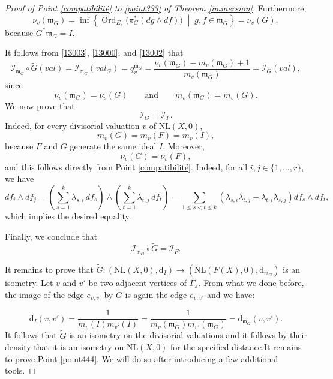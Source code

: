 \documentclass[reqno,dvipsnames,12pt]{amsart}
\begin{document}
\begin{proof}[Proof of Point \ref{compatibilité} to \ref{point333} of Theorem \ref{immersion}]
Furthermore,
\begin{equation}\label{13002}
\nu_v(\mathfrak m_G)
=
\inf \left\{
\operatorname{Ord}_{E_v}\bigl(\pi_G^*(dg\wedge df)\bigr)
\;\middle|\;
g,f\in \mathfrak m_G
\right\}
=
\nu_v(G),
\end{equation}
because \(G^*\mathfrak m_G=I\).

It follows from \eqref{13003}, \eqref{13000}, and \eqref{13002} that
\[
\mathcal{I}_{\mathfrak m_G}\circ \widetilde{G}(val)
=
\mathcal{I}_{\mathfrak m_G}(val_G)
=
q_v^{\mathfrak m_G}
=
\frac{\nu_v(\mathfrak m_G)-m_v(\mathfrak m_G)+1}{m_v(\mathfrak m_G)}
=
\mathcal{I}_{G}(val),
\]
since
\[
\nu_v(\mathfrak m_G)=\nu_v(G)
\qquad\text{and}\qquad
m_v(\mathfrak m_G)=m_v(G).
\]We now prove that
\[
\mathcal{I}_{G}=\mathcal{I}_{F}.
\]
Indeed, for every divisorial valuation \(v\) of \(\mathrm{NL}(X,0)\),
\[
m_v(G)=m_v(F)=m_v(I),
\]
because \(F\) and \(G\) generate the same ideal \(I\). Moreover,
\[
\nu_v(G)=\nu_v(F),
\]
and this follows directly from Point \ref{compatibilité}. Indeed, for all \(i,j\in \{1,\dots,r\}\), we have
\[
df_i\wedge df_j
=
\left(\sum_{s=1}^k \lambda_{s,i}\,df_s\right)
\wedge
\left(\sum_{t=1}^k \lambda_{t,j}\,df_t\right)
=
\sum_{1\le s<t\le k}
\left(
\lambda_{s,i}\lambda_{t,j}
-
\lambda_{t,i}\lambda_{s,j}
\right)
df_s\wedge df_t,
\]
which implies the desired equality.

Finally, we conclude that
\[
\mathcal{I}_{\mathfrak m_G}\circ \widetilde{G}
=
\mathcal{I}_{F}.
\]
		
		
		 It remains to prove that $\widetilde{G}:(\mathrm{NL}(X,0),\mathrm{d}_{I}) \longrightarrow (\mathrm{NL}(F(X),0),\mathrm{d}_{\mathfrak{m}_G})$ is an isometry. Let $v$ and $v'$ be two adjacent vertices of $\Gamma_{\pi}$. From what we done before, the image of the edge $e_{v,v'}$ by $\widetilde{G}$ is again the edge $e_{v,v'}$ and we have:
		

    $$\mathrm{d}_{I}(v,v')=\frac{1}{m_v(I)m_{v'}(I)}=\frac{1}{m_v(\mathfrak{m}_G)m_{v'}(\mathfrak{m}_G)}=\mathrm{d}_{\mathfrak{m}_G}(v,v').$$ It follows that $\widetilde{G}$ is an isometry on the divisorial valuations and it follows by their density  that it is an isometry on $\mathrm{NL}(X,0)$ for the specified distance.It remains to prove Point \ref{point444}. We will do so after introducing a few additional tools.
        
        \end{proof}
\end{document}
